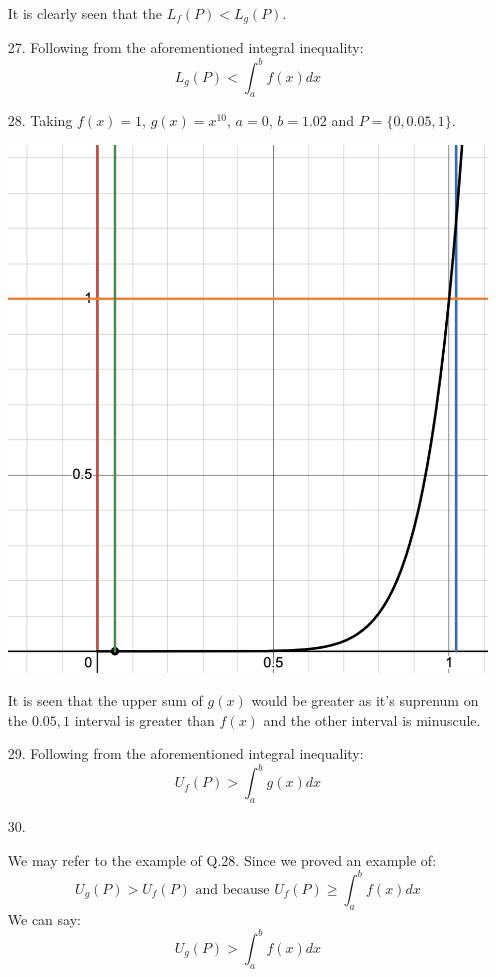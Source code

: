 \documentclass[12pt]{article}
\begin{document}
\begin{enumerate}[start=1,label={\bfseries. },leftmargin=1in]
It is clearly seen that the $L_f(P) < L_g(P)$. 

\item [27. ]
Following from the aforementioned integral inequality:
\[
L_g(P) < \int_a^b f(x)dx
\]

\item [28. ] Taking $f(x) = 1$, $g(x) = x^{10}$, $a = 0$, $b = 1.02$ and $P = \{0, 0.05, 1\}$.

\includegraphics[width=0.5\linewidth]{Math 134//Images/28.png}

It is seen that the upper sum of $g(x)$ would be greater as it's suprenum on the $0.05, 1$ interval is greater than $f(x)$ and the other interval is minuscule.

\item [29. ]
Following from the aforementioned integral inequality:
\[
U_f(P) > \int_a^b g(x)dx
\]
\item [30. ]

We may refer to the example of Q.28. Since we proved an example of:
\[
U_g(P) > U_f(P) \text{ and because } U_f(P) \geq \int_a^bf(x) dx
\]
We can say:
\[
U_g(P) > \int_a^bf(x) dx
\]

\end{enumerate}
\end{document}
